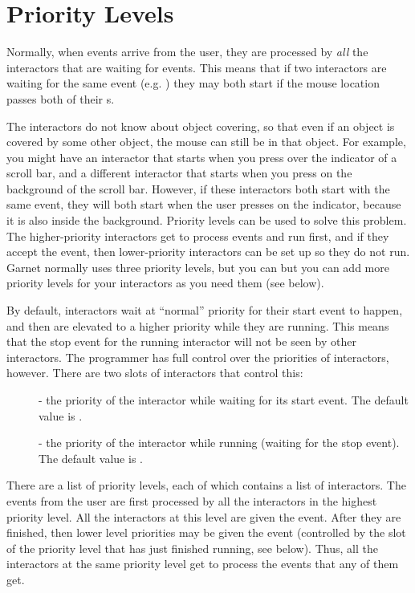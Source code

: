 \section{Priority Levels}
\label{priorities}
Normally, when events arrive from the user, they are processed by {\it all}
the interactors that are waiting for events.  This means that if two
interactors are waiting for the same event (e.g. ) they may
both start if the mouse location passes both of their s.

The interactors do not know about object covering, so that even if an
object is covered by some other object, the mouse can still be in that
object.  For example, you might have an interactor that starts when you
press over the indicator of a scroll bar, and a different interactor that
starts when you press on the background of the scroll bar.  However, if
these interactors both start with the same event, they will both start when
the user presses on the indicator, because it is also inside the
background.  Priority levels can be used to solve this problem.
The higher-priority interactors get to process events and run first, and if
they accept the event, then lower-priority interactors can be set up so
they do not run.  Garnet normally uses three priority levels, but you can
but you can add more priority levels for your interactors as you need them
(see below).

By default, interactors wait at ``normal'' priority for their
start event to happen, and then are elevated to a higher priority while
they are running.  This means that the stop event for the running
interactor will not be seen by other interactors.  The programmer has full
control over the priorities of interactors, however.  There are two slots of
interactors that control this:
\begin{description}
\item[] 
- the priority of the interactor while waiting for its start event.
The default value is .

\item[] 
- the priority of the interactor while running (waiting for the stop
event).
The default value is .
\end{description}

There are a list of priority levels, each of which contains a list of
interactors.  The events from the user are first processed by all the
interactors in the highest priority level.  All the interactors at this level
are given the event.  After they are finished, then lower level priorities
may be given the event (controlled by the  slot of the
priority level that has just finished running, see below).
Thus, all the interactors at the same priority level get to process the
events that any of them get.

